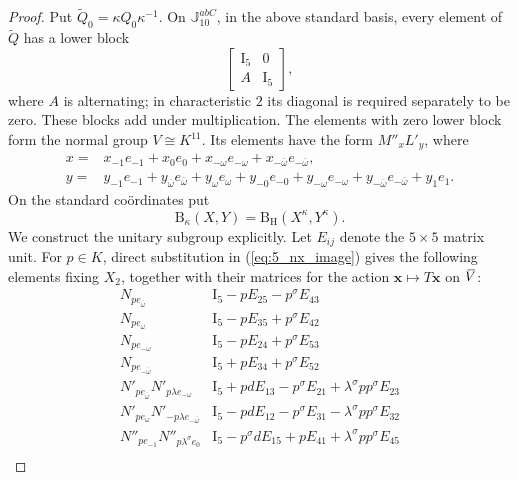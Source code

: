 \documentclass{amsart}
\def\ovV{\mathord{\mbox{\hspace*{0pt}}\,\overline{\!V\!\!\;}\!\:}\mbox{\hspace*{0pt}}}
\def\II{\mathord{\mathrm{I}}}
\newcommand{\J}{\mathbb{J}}
\renewcommand{\bar}{\overline}
\newcommand{\B}{\mathrm{B}}
\renewcommand{\H}{\mathrm{H}}
\newcommand{\s}{\sigma}
\theoremstyle{plain}
\numberwithin{theorem}{section}
\theoremstyle{definition}
\begin{document}
\begin{proof}
	Put $\widetilde Q_0=\kappa Q_0\kappa^{-1}$.  On
	$\J_{10}^{abC}$, in the above standard basis, every element of
	$\widetilde Q$ has a lower block
	\begin{equation*}
		\begin{bmatrix}\II_5&0\\ A&\II_5\end{bmatrix},
	\end{equation*}
	where $A$ is alternating; in characteristic $2$ its diagonal is required
	separately to be zero.  These blocks add under multiplication.  The elements
	with zero lower block form the normal group $V\cong K^{11}$.  Its elements
	have the form $M''_xL'_y$, where
	\begin{equation*}
	\begin{split}
		x={}&x_{-1}e_{-1}+x_0e_0+x_{-\omega}e_{-\omega}
		+x_{-\bar\omega}e_{-\bar\omega},\\
		y={}&y_{-1}e_{-1}+y_{\bar\omega}e_{\bar\omega}+y_\omega e_\omega
		+y_{-0}e_{-0}+y_{-\omega}e_{-\omega}
		+y_{-\bar\omega}e_{-\bar\omega}+y_1e_1.
	\end{split}
	\end{equation*}
	On the standard co\"{o}rdinates put
	\begin{equation*}
		\B_\kappa(X,Y)=\B_{\H}(X^\kappa,Y^\kappa).
	\end{equation*}
	We construct the unitary subgroup explicitly.  Let $E_{ij}$ denote the
	$5\times5$ matrix unit.  For $p\in K$, direct substitution in
	(\ref{eq:5_nx_image}) gives the following elements fixing $X_2$, together
	with their matrices for the action $\mathbf x\mapsto T\mathbf x$ on $\ovV$:
	\begin{equation}
	\label{eq:7_type2_SU_generators}
	\begin{array}{c|c}
	N_{p e_{\bar\omega}}&\II_5-pE_{25}-p^{\s}E_{43}\\
	N_{p e_\omega}&\II_5-pE_{35}+p^{\s}E_{42}\\
	N_{p e_{-\omega}}&\II_5-pE_{24}+p^{\s}E_{53}\\
	N_{p e_{-\bar\omega}}&\II_5+pE_{34}+p^{\s}E_{52}\\
	N'_{p e_{\bar\omega}}N'_{p\lambda e_{-\omega}}&
	\II_5+pdE_{13}-p^{\s}E_{21}+\lambda^{\s}pp^{\s}E_{23}\\
	N'_{p e_\omega}N'_{-p\lambda e_{-\bar\omega}}&
	\II_5-pdE_{12}-p^{\s}E_{31}-\lambda^{\s}pp^{\s}E_{32}\\
	N''_{p e_{-1}}N''_{p\lambda^{\s}e_0}&
	\II_5-p^{\s}dE_{15}+pE_{41}+\lambda^{\s}pp^{\s}E_{45}\\

\end{array}
\end{equation}
\end{proof}
\end{document}
